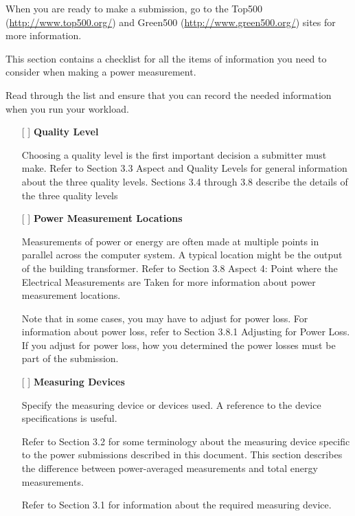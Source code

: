 
\noindent
When you are ready to make a submission, go to the Top500 
(\url{http://www.top500.org/}) 
and Green500 (\url{http://www.green500.org/}) sites for more information. 
\wl

\noindent
This section contains a checklist for all the items of information you need 
to consider when making a power measurement. 
\wl

\noindent
Read through the list and ensure that you can record the needed 
information when you run your workload.
\wl

\begin{itemize}
\item[{[ ]}]
\textbf{Quality Level}

Choosing a quality level is the first important decision a submitter must make. Refer to Section 3.3 Aspect and Quality Levels for general information about the three quality levels.  Sections 3.4 through 3.8 describe the details of the three quality levels

\item[{[ ]}]
\textbf{Power Measurement Locations}

Measurements of power or energy are often made at multiple points in parallel across the computer system. A typical location might be the output of the building transformer.
Refer to Section 3.8 Aspect 4: Point where the Electrical Measurements are Taken for more information about power measurement locations.

Note that in some cases, you may have to adjust for power loss. For information about power loss, refer to Section 3.8.1 Adjusting for Power Loss.  If you adjust for power loss, how you determined the power losses must be part of the submission.


\newpage

\item[{[ ]}]
\textbf{Measuring Devices}

Specify the measuring device or devices used. A reference to the device specifications is useful.

Refer to Section 3.2 for some terminology about the measuring device specific to the power submissions described in this document. This section describes the difference between power-averaged measurements and total energy measurements.

Refer to Section 3.1 for information about the required measuring device.


\end{itemize}
